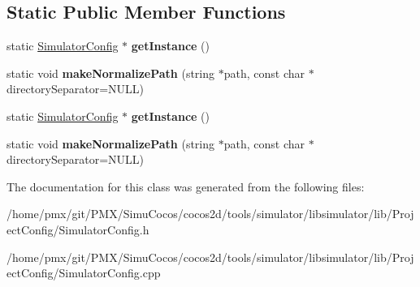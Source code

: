 \subsection*{Static Public Member Functions}
\begin{DoxyCompactItemize}
\item 
\mbox{\label{classSimulatorConfig_a44c8d0c4af92d4c0d923465311091aef}} 
static \hyperlink{classSimulatorConfig}{Simulator\+Config} $\ast$ {\bfseries get\+Instance} ()
\item 
\mbox{\label{classSimulatorConfig_a17059307efeffb08421c5e28458dee6b}} 
static void {\bfseries make\+Normalize\+Path} (string $\ast$path, const char $\ast$directory\+Separator=N\+U\+LL)
\item 
\mbox{\label{classSimulatorConfig_a8dc458b2b8df2801f97819f13c5e6e2e}} 
static \hyperlink{classSimulatorConfig}{Simulator\+Config} $\ast$ {\bfseries get\+Instance} ()
\item 
\mbox{\label{classSimulatorConfig_ae28549ab033c3f18c82fee82df6f89e8}} 
static void {\bfseries make\+Normalize\+Path} (string $\ast$path, const char $\ast$directory\+Separator=N\+U\+LL)
\end{DoxyCompactItemize}


The documentation for this class was generated from the following files\+:\begin{DoxyCompactItemize}
\item 
/home/pmx/git/\+P\+M\+X/\+Simu\+Cocos/cocos2d/tools/simulator/libsimulator/lib/\+Project\+Config/Simulator\+Config.\+h\item 
/home/pmx/git/\+P\+M\+X/\+Simu\+Cocos/cocos2d/tools/simulator/libsimulator/lib/\+Project\+Config/Simulator\+Config.\+cpp\end{DoxyCompactItemize}
